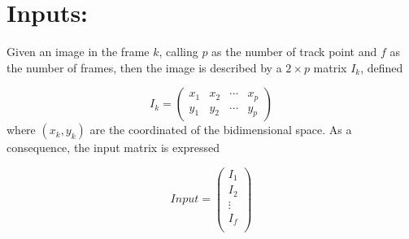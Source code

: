 \section{Inputs:}
Given an image in the frame $k$, calling $p$ as the number of track point and $f$ as the number of frames, then the image is described by a $2\times p$ matrix $I_k$, defined

\begin{equation}
I_{k}=
\begin{pmatrix}
x_{1} & x_{2} & \cdots & x_{p}\\
y_{1} & y_{2} & \cdots & y_{p}
\end{pmatrix}
\end{equation}
where $(x_k,y_k)$ are the coordinated of the bidimensional space.
As a consequence, the input matrix is expressed

\begin{equation}
Input=
\begin{pmatrix}
I_{1}\\
I_{2}\\
\vdots\\
I_{f}\\
\end{pmatrix}
\end{equation}